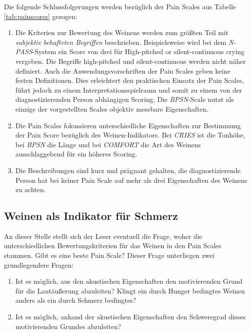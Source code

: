 Die folgende Schlussfolgerungen werden bezüglich der Pain Scales aus Tabelle \ref{tab:painscores} gezogen:

\begin{enumerate}
	
	\item Die Kriterien zur Bewertung des Weinens werden zum größten Teil mit \emph{subjektiv behafteten Begriffen} beschrieben. Beispielsweise wird bei dem \emph{N-PASS}-System ein Score von drei für \glqq High-pitched or silent-continuous crying\grqq{} vergeben. Die Begriffe \glqq high-pitched\grqq{} und \glqq silent-continuous\grqq{} werden nicht näher definiert.  Auch die Anwendungsvorschriften der Pain Scales geben keine festen Definitionen. Dies erleichtert den praktischen Einsatz der Pain Scales, führt jedoch zu einem Interpretationsspielraum und somit zu einem von der diagnostizierenden Person abhängigen Scoring. Die \emph{BPSN}-Scale nutzt als einzige der vorgestellten Scales objektiv messbare Eigenschaften. 
	
	\item Die Pain Scales fokussieren unterschiedliche Eigenschaften zur Bestimmung der Pain Score bezüglich des Weinen-Indikators. Bei \emph{CRIES} ist die Tonhöhe, bei \emph{BPSN} die Länge und bei \emph{COMFORT} die Art des Weinens ausschlaggebend für ein höheres Scoring.
	
	\item Die Beschreibungen sind kurz und prägnant gehalten, die diagnostizierende Person hat bei keiner Pain Scale auf mehr als drei Eigenschaften des Weinens zu achten.
\end{enumerate}


\subsection{Weinen als Indikator für Schmerz}
\label{sec:foundations_cryingMeta}

An dieser Stelle stellt sich der Leser eventuell die Frage, woher die unterschiedlichen Bewertungskriterien für das Weinen in den Pain Scales stammen. Gibt es eine \glqq beste\grqq{} Pain Scale? Dieser Frage unterliegen zwei grundlegendere Fragen:

\begin{enumerate}
	\item Ist es möglich, aus den akustischen Eigenschaften den motivierenden Grund für die Lautäußerung abzuleiten?  Klingt ein durch Hunger bedingtes Weinen anders als ein durch Schmerz bedingtes?
	\item Ist es möglich, anhand der akustischen Eigenschaften den Schweregrad dieses motivierenden Grundes abzuleiten?
\end{enumerate}

